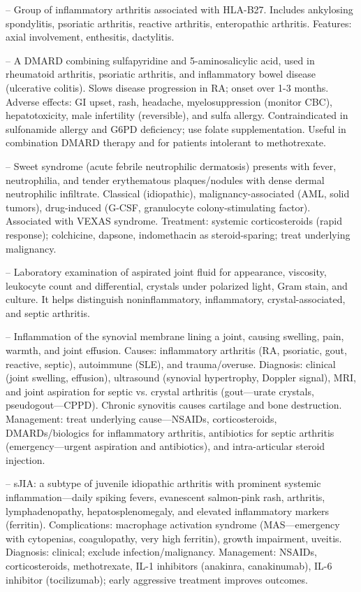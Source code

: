-- Group of inflammatory arthritis associated with HLA-B27. Includes ankylosing spondylitis, psoriatic arthritis, reactive arthritis, enteropathic arthritis. Features: axial involvement, enthesitis, dactylitis.


-- A DMARD combining sulfapyridine and 5-aminosalicylic acid, used in rheumatoid arthritis, psoriatic arthritis, and inflammatory bowel disease (ulcerative colitis). Slows disease progression in RA; onset over 1-3 months. Adverse effects: GI upset, rash, headache, myelosuppression (monitor CBC), hepatotoxicity, male infertility (reversible), and sulfa allergy. Contraindicated in sulfonamide allergy and G6PD deficiency; use folate supplementation. Useful in combination DMARD therapy and for patients intolerant to methotrexate.

-- Sweet syndrome (acute febrile neutrophilic dermatosis) presents with fever, neutrophilia, and tender erythematous plaques/nodules with dense dermal neutrophilic infiltrate. Classical (idiopathic), malignancy-associated (AML, solid tumors), drug-induced (G-CSF, granulocyte colony-stimulating factor). Associated with VEXAS syndrome. Treatment: systemic corticosteroids (rapid response); colchicine, dapsone, indomethacin as steroid-sparing; treat underlying malignancy.

-- Laboratory examination of aspirated joint fluid for appearance, viscosity, leukocyte count and differential, crystals under polarized light, Gram stain, and culture. It helps distinguish noninflammatory, inflammatory, crystal-associated, and septic arthritis.

-- Inflammation of the synovial membrane lining a joint, causing swelling, pain, warmth, and joint effusion. Causes: inflammatory arthritis (RA, psoriatic, gout, reactive, septic), autoimmune (SLE), and trauma/overuse. Diagnosis: clinical (joint swelling, effusion), ultrasound (synovial hypertrophy, Doppler signal), MRI, and joint aspiration for septic vs. crystal arthritis (gout—urate crystals, pseudogout—CPPD). Chronic synovitis causes cartilage and bone destruction. Management: treat underlying cause—NSAIDs, corticosteroids, DMARDs/biologics for inflammatory arthritis, antibiotics for septic arthritis (emergency—urgent aspiration and antibiotics), and intra-articular steroid injection.

-- sJIA: a subtype of juvenile idiopathic arthritis with prominent systemic inflammation—daily spiking fevers, evanescent salmon-pink rash, arthritis, lymphadenopathy, hepatosplenomegaly, and elevated inflammatory markers (ferritin). Complications: macrophage activation syndrome (MAS—emergency with cytopenias, coagulopathy, very high ferritin), growth impairment, uveitis. Diagnosis: clinical; exclude infection/malignancy. Management: NSAIDs, corticosteroids, methotrexate, IL-1 inhibitors (anakinra, canakinumab), IL-6 inhibitor (tocilizumab); early aggressive treatment improves outcomes.

